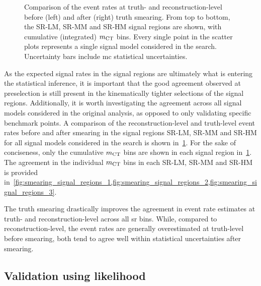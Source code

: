 \begin{figure}
\begin{subfigure}[b]{0.49\linewidth}
	\end{subfigure}
	\caption{Comparison of the event rates at truth- and reconstruction-level before (left) and after (right) truth smearing. From top to bottom, the SR-LM, SR-MM and SR-HM signal regions are shown, with cumulative (integrated) $m_{\textrm{CT}}$ bins. Every single point in the scatter plots represents a single signal model considered in the \onelepton search. Uncertainty bars include \gls{mc} statistical uncertainties.}
	\label{fig:smearing_signal_regions}
\end{figure}
 
 As the expected signal rates in the signal regions are ultimately what is entering the statistical inference, it is important that the good agreement observed at preselection is still present in the kinematically tighter selections of the signal regions.
 Additionally, it is worth investigating the agreement across all signal models considered in the original analysis, as opposed to only validating specific benchmark points.
 A comparison of the reconstruction-level and truth-level event rates before and after smearing in the signal regions SR-LM, SR-MM and SR-HM for all signal models considered in the \onelepton search is shown in~\cref{fig:smearing_signal_regions}.
 For the sake of conciseness, only the cumulative $m_{\textrm{CT}}$ bins are shown in each signal region in~\cref{fig:smearing_signal_regions}.
 The agreement in the individual $m_{\textrm{CT}}$ bins in each SR-LM, SR-MM and SR-HM is provided in~\cref{fig:smearing_signal_regions_1,fig:smearing_signal_regions_2,fig:smearing_signal_regions_3}.
 
The truth smearing drastically improves the agreement in event rate estimates at truth- and reconstruction-level across all \gls{sr} bins.
While, compared to reconstruction-level, the event rates are generally overestimated at truth-level before smearing, both tend to agree well within statistical uncertainties after smearing. 
 
\subsection{Validation using likelihood}

